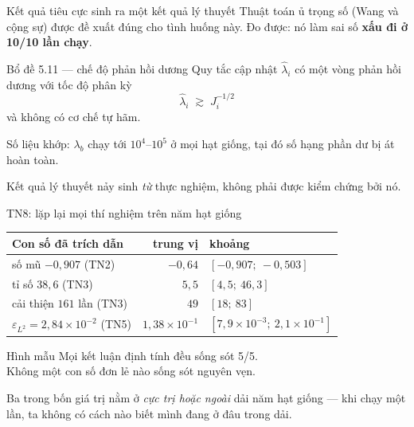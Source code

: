 \documentclass[aspectratio=169,11pt]{beamer}
\newcommand{\bad}[1]{\textcolor{bad}{\textbf{#1}}}
\begin{document}
\begin{frame}{Kết quả tiêu cực sinh ra một kết quả lý thuyết}
\small
Thuật toán ủ trọng số (Wang và cộng sự) được đề xuất đúng cho tình huống này.
Đo được: nó làm sai số \bad{xấu đi ở 10/10 lần chạy}.

\medskip
\begin{alertblock}{Bổ đề 5.11 --- chế độ phản hồi dương}
Quy tắc cập nhật $\hat\lambda_i$ có một vòng phản hồi dương với tốc độ phân kỳ
\[
\hat\lambda_i \;\gtrsim\; J_i^{-1/2}
\]
và \alert{không có cơ chế tự hãm}.
\end{alertblock}

\medskip
Số liệu khớp: $\lambda_b$ chạy tới $10^4$--$10^5$ ở mọi hạt giống, tại đó số hạng
phần dư bị át hoàn toàn.

\centering
\alert{Kết quả lý thuyết nảy sinh \emph{từ} thực nghiệm,
không phải được kiểm chứng bởi nó.}
\end{frame}

\begin{frame}{TN8: lặp lại mọi thí nghiệm trên năm hạt giống}
\begin{table}
\small
\begin{tabular}{@{}lrl@{}}
\toprule
\textbf{Con số đã trích dẫn} & \textbf{trung vị} & \textbf{khoảng} \\
\midrule
số mũ $-0{,}907$ (TN2)            & $-0{,}64$ & $[-0{,}907;\ -0{,}503]$ \\
tỉ số $38{,}6$ (TN3)              & $5{,}5$   & $[4{,}5;\ 46{,}3]$ \\
cải thiện $161$ lần (TN3)         & $49$      & $[18;\ 83]$ \\
$\varepsilon_{L^2} = 2{,}84\times10^{-2}$ (TN5)
  & $1{,}38\times10^{-1}$ & $[7{,}9\times10^{-3};\ 2{,}1\times10^{-1}]$ \\
\bottomrule
\end{tabular}
\end{table}

\medskip
\begin{alertblock}{Hình mẫu}
\alert{Mọi kết luận định tính đều sống sót 5/5.\\
Không một con số đơn lẻ nào sống sót nguyên vẹn.}
\end{alertblock}

\footnotesize
Ba trong bốn giá trị nằm ở \emph{cực trị hoặc ngoài} dải năm hạt giống ---
khi chạy một lần, ta không có cách nào biết mình đang ở đâu trong dải.
\end{frame}
\end{document}
